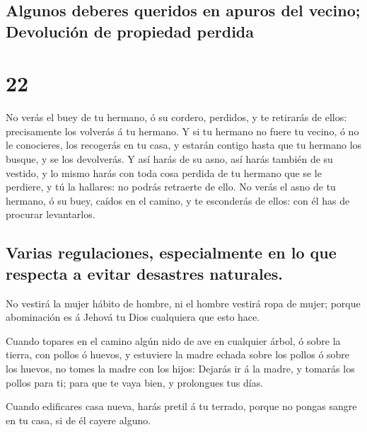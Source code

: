\hypertarget{algunos-deberes-queridos-en-apuros-del-vecino-devoluciuxf3n-de-propiedad-perdida}{%
\subsection{Algunos deberes queridos en apuros del vecino; Devolución de
propiedad
perdida}\label{algunos-deberes-queridos-en-apuros-del-vecino-devoluciuxf3n-de-propiedad-perdida}}

\hypertarget{section-21}{%
\section{22}\label{section-21}}

 No verás el buey de tu hermano, ó su cordero, perdidos, y
te retirarás de ellos: precisamente los volverás á tu hermano.
 Y si tu hermano no fuere tu vecino, ó no le conocieres, los
recogerás en tu casa, y estarán contigo hasta que tu hermano los busque,
y se los devolverás.  Y así harás de su asno, así harás
también de su vestido, y lo mismo harás con toda cosa perdida de tu
hermano que se le perdiere, y tú la hallares: no podrás retraerte de
ello.  No verás el asno de tu hermano, ó su buey, caídos en
el camino, y te esconderás de ellos: con él has de procurar levantarlos.

\hypertarget{varias-regulaciones-especialmente-en-lo-que-respecta-a-evitar-desastres-naturales.}{%
\subsection{Varias regulaciones, especialmente en lo que respecta a
evitar desastres
naturales.}\label{varias-regulaciones-especialmente-en-lo-que-respecta-a-evitar-desastres-naturales.}}

 No vestirá la mujer hábito de hombre, ni el hombre vestirá
ropa de mujer; porque abominación es á Jehová tu Dios cualquiera que
esto hace.

 Cuando topares en el camino algún nido de ave en cualquier
árbol, ó sobre la tierra, con pollos ó huevos, y estuviere la madre
echada sobre los pollos ó sobre los huevos, no tomes la madre con los
hijos:  Dejarás ir á la madre, y tomarás los pollos para ti;
para que te vaya bien, y prolongues tus días.

 Cuando edificares casa nueva, harás pretil á tu terrado,
porque no pongas sangre en tu casa, si de él cayere alguno.

